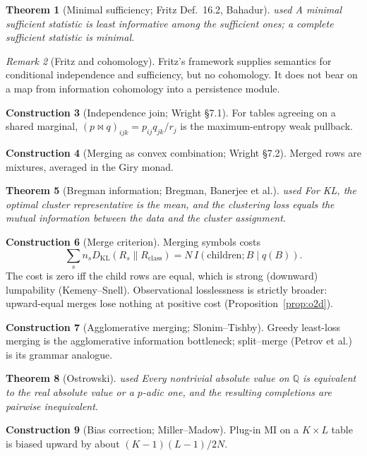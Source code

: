 \documentclass[11pt]{article}
\newtheorem{theorem}{Theorem}[section]
\theoremstyle{definition}
\newtheorem{construction}[theorem]{Construction}
\theoremstyle{remark}
\newtheorem{remark}[theorem]{Remark}
\newcommand{\Q}{\mathbb{Q}}
\newcommand{\KL}{D_{\mathrm{KL}}}
\newcommand{\st}[1]{\textsf{\small\color{gray}#1}}
\begin{document}
\begin{theorem}[Minimal sufficiency; Fritz Def.~16.2, Bahadur]\label{res:auto5}\st{used}
A minimal sufficient statistic is least informative among the sufficient ones; a complete sufficient statistic is minimal.
\end{theorem}
\begin{remark}[Fritz and cohomology]
Fritz's framework supplies semantics for conditional independence and sufficiency, but no cohomology. It does not bear on a map from information cohomology into a persistence module.
\end{remark}
\begin{construction}[Independence join; Wright \S7.1] For tables agreeing on a shared marginal, $(p\bowtie q)_{ijk}=p_{ij}q_{jk}/r_j$ is the maximum-entropy weak pullback.\end{construction}
\begin{construction}[Merging as convex combination; Wright \S7.2] Merged rows are mixtures, averaged in the Giry monad.\end{construction}
\begin{theorem}[Bregman information; Bregman, Banerjee et al.]\label{thm:breg}\st{used}
For KL, the optimal cluster representative is the mean, and the clustering loss equals the mutual information between the data and the cluster assignment.
\end{theorem}
\begin{construction}[Merge criterion]
Merging symbols costs
\[\textstyle\sum_s n_s\KL(R_s\|R_{\text{class}})=N\,I(\text{children};B\mid q(B)).\] The cost is zero iff the child rows are equal, which is strong (downward) lumpability (Kemeny--Snell). Observational losslessness is strictly broader: upward-equal merges lose nothing at positive cost (Proposition~\ref{prop:o2d}).
\end{construction}
\begin{construction}[Agglomerative merging; Slonim--Tishby] Greedy least-loss merging is the agglomerative information bottleneck; split--merge (Petrov et al.) is its grammar analogue.\end{construction}
\begin{theorem}[Ostrowski]\label{thm:ostrowski}\st{used}
Every nontrivial absolute value on $\Q$ is equivalent to the real absolute value or a $p$-adic one, and the resulting completions are pairwise inequivalent.
\end{theorem}
\begin{construction}[Bias correction; Miller--Madow] Plug-in MI on a $K\times L$ table is biased upward by about $(K-1)(L-1)/2N$.\end{construction}
\end{document}
